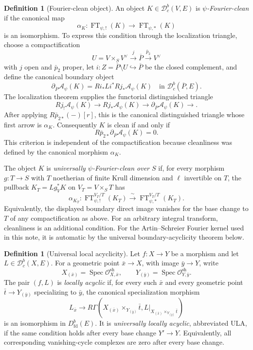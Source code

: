 \documentclass[10pt]{article}
\theoremstyle{definition}
\newtheorem{definition}[theorem]{Definition}
\newcommand{\Dbc}{\mathcal D^b_c}
\newcommand{\FT}{\operatorname{FT}}
\newcommand{\Spec}{\operatorname{Spec}}
\begin{document}
\begin{definition}[Fourier-clean object]
An object \(K\in\Dbc(V,E)\) is \emph{\(\psi\)-Fourier-clean} if the canonical
map
\[
 \alpha_K:\FT_{\psi,!}(K)\longrightarrow\FT_{\psi,*}(K)
\]
is an isomorphism.  To express this condition through the localization
triangle, choose a compactification
\[
 U=V\times_SV^\vee\xrightarrow{\,j\,}\overline P
 \xrightarrow{\,\bar p_2\,}V^\vee
\]
with \(j\) open and \(\bar p_2\) proper, let
\(i:Z=\overline P\setminus U\hookrightarrow\overline P\) be the closed
complement, and define the canonical boundary object
\[
 \partial_{\overline P}\mathcal A_\psi(K)
 =Ri_*Li^*Rj_*\mathcal A_\psi(K)\quad\text{in }\Dbc(\overline P,E).
\]
The localization theorem supplies the functorial distinguished triangle
\[
 Rj_!\mathcal A_\psi(K)\longrightarrow
 Rj_*\mathcal A_\psi(K)\longrightarrow
 \partial_{\overline P}\mathcal A_\psi(K)\longrightarrow.
\]
After applying \(R\bar p_{2*}(-)[r]\), this is the canonical distinguished
triangle whose first arrow is \(\alpha_K\).  Consequently \(K\) is clean
if and only if
\[
 R\bar p_{2*}\partial_{\overline P}\mathcal A_\psi(K)=0.
\]
This criterion is independent of the compactification because cleanliness
was defined by the canonical morphism \(\alpha_K\).

The object \(K\) is \emph{universally \(\psi\)-Fourier-clean over \(S\)}
if, for every morphism \(g:T\to S\) with \(T\) noetherian of finite Krull
dimension and \(\ell\) invertible on \(T\), the pullback
\(K_T=Lg_V^*K\) on \(V_T=V\times_ST\) has
\[
 \alpha_{K_T}:\FT^{V_T/T}_{\psi,!}(K_T)
 \xrightarrow{\ \sim\ }\FT^{V_T/T}_{\psi,*}(K_T).
\]
Equivalently, the displayed boundary direct image vanishes for the base
change to \(T\) of any compactification as above.  For an arbitrary
integral transform, cleanliness is an additional condition.  For the
Artin--Schreier Fourier kernel used in this note, it is automatic by the
universal boundary-acyclicity theorem below.
\end{definition}

\begin{definition}[Universal local acyclicity]
Let \(f:X\to Y\) be a morphism and let \(L\in\Dbc(X,E)\).  For a geometric
point \(\bar x\to X\), with image \(\bar y\to Y\), write
\[
 X_{(\bar x)}=\Spec\mathcal O^{\mathrm{sh}}_{X,\bar x},
 \qquad
 Y_{(\bar y)}=\Spec\mathcal O^{\mathrm{sh}}_{Y,\bar y}.
\]
The pair \((f,L)\) is \emph{locally acyclic} if, for every such \(\bar x\)
and every geometric point \(\bar t\to Y_{(\bar y)}\) specializing to
\(\bar y\), the canonical specialization morphism
\[
 L_{\bar x}\longrightarrow
 R\Gamma\!\left(
 X_{(\bar x)}\times_{Y_{(\bar y)}}\bar t,
 L|_{X_{(\bar x)}\times_{Y_{(\bar y)}}\bar t}
 \right)
\]
is an isomorphism in \(D^b_{\mathrm{fd}}(E)\).  It is \emph{universally
locally acyclic}, abbreviated ULA, if the same condition holds after every
base change \(Y'\to Y\).  Equivalently, all corresponding vanishing-cycle
complexes are zero after every base change.
\end{definition}
\end{document}
